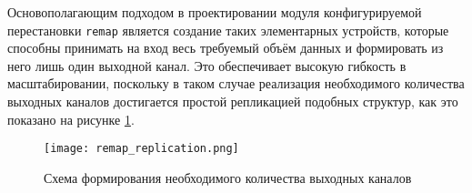 Основополагающим подходом в проектировании модуля конфигурируемой перестановки \texttt{remap} является создание таких элементарных устройств, которые способны принимать на вход весь требуемый объём данных и формировать из него лишь один выходной канал. Это обеспечивает высокую гибкость в масштабировании, поскольку в таком случае реализация необходимого количества выходных каналов достигается простой репликацией подобных структур, как это показано на рисунке \ref{fig:remap_replication}.\par

\begin{figure}[ht]
    \centering
    \texttt{[image: remap\_replication.png]}
    \caption{Схема формирования необходимого количества выходных каналов}
    \label{fig:remap_replication}
\end{figure}\par

